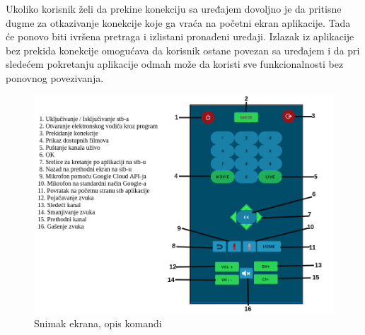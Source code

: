 \documentclass[implementacija.tex]{subfiles}
\begin{document}



Ukoliko korisnik želi da prekine konekciju sa uređajem dovoljno je da pritisne dugme za otkazivanje konekcije koje ga vraća na početni ekran aplikacije. Tada će ponovo biti ivršena pretraga i izlistani pronađeni uređaji. Izlazak iz aplikacije bez prekida konekcije omogućava da korisnik ostane povezan sa uređajem i da pri sledećem pokretanju aplikacije odmah može da koristi sve funkcionalnosti bez ponovnog povezivanja.

\begin{figure}[h!]
  \centering
  \includegraphics[width=\textwidth]{Implementacija/snimci_ekrana/komande_sa_opisom.png}
  \caption{Snimak ekrana, opis komandi}
   \label{fig:opis_komandi}
\end{figure}
\end{document}
